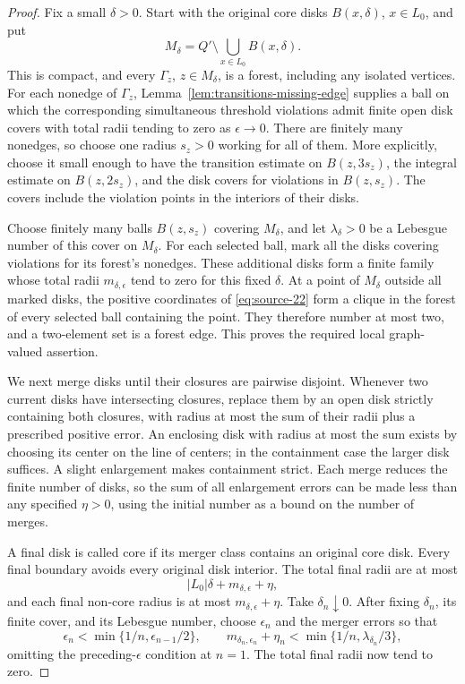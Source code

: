 \begin{proof}
Fix a small $\delta>0$.  Start with the original core disks
$B(x,\delta)$, $x\in L_0$, and put
\[
 M_\delta=Q'\setminus\bigcup_{x\in L_0}B(x,\delta).
\]
This is compact, and every $\Gamma_z$, $z\in M_\delta$, is a forest,
including any isolated vertices.  For each nonedge of $\Gamma_z$,
Lemma~\ref{lem:transitions-missing-edge} supplies a ball on which the
corresponding simultaneous threshold violations admit finite open
disk covers with total radii tending to zero as $\epsilon\to0$.
There are finitely many nonedges, so choose one radius $s_z>0$
working for all of them.  More explicitly, choose it small enough
to have the transition estimate on $B(z,3s_z)$, the integral
estimate on $B(z,2s_z)$, and the disk covers for violations in
$B(z,s_z)$.  The covers include the violation points in the
interiors of their disks.

Choose finitely many balls $B(z,s_z)$ covering $M_\delta$, and let
$\lambda_\delta>0$ be a Lebesgue number of this cover on $M_\delta$.
For each selected ball, mark all the disks covering violations for
its forest's nonedges.  These additional disks form a finite family
whose total radii $m_{\delta,\epsilon}$ tend to zero for this fixed
$\delta$.  At a point of $M_\delta$ outside all marked disks, the
positive coordinates of \eqref{eq:source-22} form a clique in the
forest of every selected ball containing the point.  They therefore
number at most two, and a two-element set is a forest edge.  This
proves the required local graph-valued assertion.

We next merge disks until their closures are pairwise disjoint.
Whenever two current disks have intersecting closures, replace them
by an open disk strictly containing both closures, with radius at
most the sum of their radii plus a prescribed positive error.
An enclosing disk with radius at most the sum exists by choosing its
center on the line of centers; in the containment case the larger
disk suffices.  A slight enlargement makes containment strict.
Each merge reduces the finite number of disks, so the sum of all
enlargement errors can be made less than any specified
$\eta>0$, using the initial number as a bound on the number of merges.

A final disk is called core if its merger class contains an original
core disk.  Every final boundary avoids every original disk interior.
The total final radii are at most
\[
 |L_0|\delta+m_{\delta,\epsilon}+\eta,
\]
and each final non-core radius is at most
$m_{\delta,\epsilon}+\eta$.  Take $\delta_n\downarrow0$.
After fixing $\delta_n$, its finite cover, and its Lebesgue number,
choose $\epsilon_n$ and the merger errors so that
\[
 \epsilon_n<\min\{1/n,\epsilon_{n-1}/2\},\qquad
 m_{\delta_n,\epsilon_n}+\eta_n
   <\min\{1/n,\lambda_{\delta_n}/3\},
\]
omitting the preceding-$\epsilon$ condition at $n=1$.
The total final radii now tend to zero.


\end{proof}
